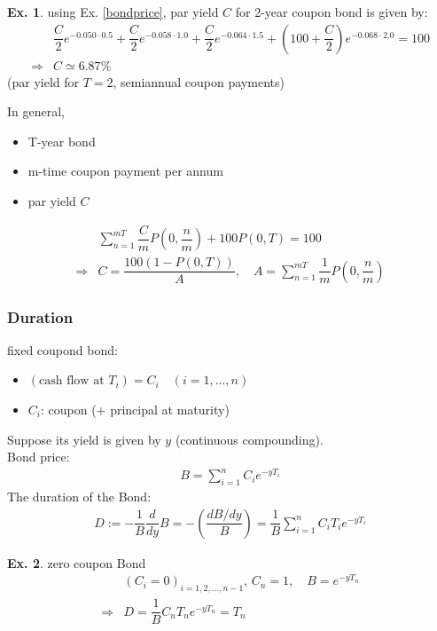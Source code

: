 \documentclass[a4paper,11pt]{jsarticle}
\theoremstyle{definition}
\newtheorem{ex}{Ex.}[subsection]
\newcommand{\df}[2]{\dfrac{#1}{#2}}
\begin{document}
\begin{ex}
  using Ex. \ref{bondprice}, 
  par yield $C$ for 2-year coupon bond is given by:
  \begin{align}
    &\df{C}{2}e^{-0.050\cdot 0.5}+\df{C}{2}e^{-0.058\cdot 1.0}
    +\df{C}{2}e^{-0.064\cdot 1.5}
    +\left(100+\df{C}{2}\right)e^{-0.068\cdot 2.0}=100 \\
    \Rightarrow& C\simeq 6.87\%
  \end{align}
  (par yield for $T=2$, semiannual coupon payments) \par
  In general, 
  \begin{itemize}
    \item T-year bond
    \item m-time coupon payment per annum
    \item par yield $C$
  \end{itemize}
  \begin{align}
    &\sum_{n=1}^{mT}\df{C}{m}P\left(0,\df{n}{m}\right)+100P(0,T)=100 \\
    \Rightarrow& C=\df{100(1-P(0,T))}{A}, \quad
    A=\sum_{n=1}^{mT}\df{1}{m}P\left(0,\df{n}{m}\right)
  \end{align}
\end{ex}


\subsubsection{Duration}
fixed coupond bond:
\begin{itemize}
  \item $(\mbox{cash flow at } T_i) =C_i \quad (i=1, ..., n)$
  \item $C_i$: coupon (+ principal at maturity)
\end{itemize}
Suppose its yield is given by $y$ (continuous compounding).\\
Bond price: 
\begin{align}
  B=\sum_{i=1}^{n}C_i e^{-yT_i}
\end{align}
The duration of the Bond:
\begin{align}
  D:=-\df{1}{B} \df{d}{dy} B= -\left(\df{dB/dy}{B} \right) 
  =\df{1}{B}\sum_{i=1}^{n}C_i T_i e^{-yT_i}
\end{align}

\begin{ex}{zero coupon Bond}
  \begin{align}
    &(C_i=0)_{i=1,2,...,n-1}, \, C_n=1, \quad B=e^{-yT_n}\\
    \Rightarrow& D=\df{1}{B}C_n T_n e^{-yT_n}=T_n
  \end{align}
\end{ex}
\end{document}
